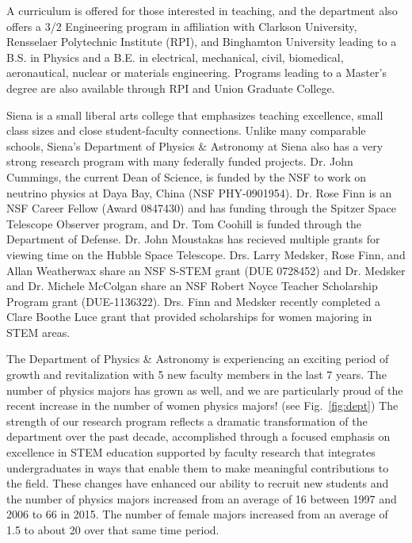 \documentclass[11pt]{article}
\begin{document}
A curriculum is offered for those interested in teaching, and the department also offers a 3/2 Engineering
program in affiliation with Clarkson University, Rensselaer Polytechnic Institute (RPI),
and Binghamton University leading to a B.S. in Physics and a
B.E. in electrical, mechanical, civil, biomedical, aeronautical, nuclear or materials engineering.
Programs leading to a Master's degree are also available through RPI and Union Graduate College.

Siena is a small liberal arts college that emphasizes teaching excellence, small class sizes and close 
student-faculty connections.  Unlike many comparable schools, Siena's Department of Physics \&
Astronomy at Siena also has a very strong research program with many federally funded projects.  
Dr. John Cummings, the current Dean of Science, is funded by the NSF to work on 
neutrino physics at Daya Bay, China (NSF PHY-0901954).  Dr. Rose Finn is an 
NSF Career Fellow (Award 0847430) and has funding through the Spitzer Space Telescope Observer program, 
and Dr. Tom Coohill is funded through the Department of Defense.  Dr. John Moustakas
has recieved multiple grants for viewing time on the Hubble Space Telescope. Drs. Larry Medsker, Rose Finn, and 
Allan Weatherwax share an NSF S-STEM grant (DUE 0728452) and Dr. Medsker and Dr. Michele McColgan share 
an NSF Robert Noyce Teacher Scholarship Program grant (DUE-1136322). Drs. Finn and Medsker recently 
completed a Clare Boothe Luce grant that provided scholarships for women majoring in STEM areas. 
 
The Department of Physics \& Astronomy is experiencing an exciting
period of growth and revitalization with 5 new faculty members in the
last 7 years.  The number of physics majors has grown as well, and we
are particularly proud of the recent increase in the number of women
physics majors! (see Fig.~\ref{fig:dept})
The strength of our research program reflects a dramatic transformation of the department over the 
past decade, accomplished through a focused emphasis on excellence in STEM education supported by 
faculty research that integrates undergraduates in ways that enable them to make meaningful contributions 
to the field.  These changes have enhanced our ability to recruit new students and the number of 
physics majors increased from an average of 16 between 1997 and 2006 to 66 in 2015. The number of 
female majors increased from an average of 1.5 to about 20 over that same time period.
 
\end{document}

